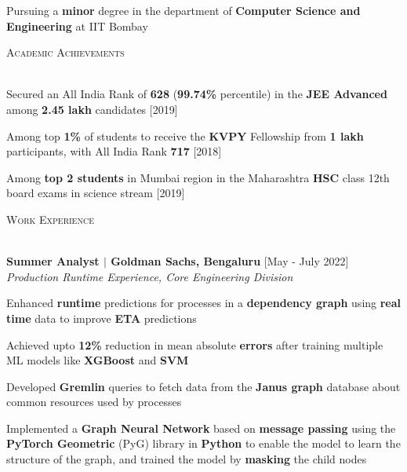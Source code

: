 \documentclass[10pt]{article}
\renewcommand{\section}[1]{
    \vspace*{3pt}
    \textsc{\Large{#1}}
    \vspace*{-8pt} \\ \hspace*{-5pt} 
    \hrulefill \\
    \vspace*{-15pt}
    \vspace*{-5pt}
}
\newcommand{\smallbullet}{
    \small$\bullet$
}
\newenvironment{bullet-list-major}{
    \vspace*{6pt}
    \begin{list}{
        \smallbullet
    }{
        \setlength\leftmargin{15pt}\topsep -5pt \itemsep -6pt
    }
} {
    \end{list}
}
\newcommand{\bigblock}[3]{
    {
        \vspace*{2pt}
        \hspace*{-8pt} {\large{\textbf{#1}}} \hfill #2 \newline
        \textit{\textsf{#3}}
    }
}
\newenvironment{bullet-list-minor}{
    \begin{list}{
        \smallbullet
    }{
        \setlength\leftmargin{15pt}\topsep -5pt \itemsep -6pt
    }
} {
    \end{list}
}
\begin{document}


    \vspace{-22pt}
    Pursuing a \textbf{minor} degree in the department of \textbf{Computer Science and Engineering} at IIT Bombay
    \vspace{-5pt}

    \section{Academic Achievements}
    \begin{bullet-list-major}
        \item Secured an All India Rank of \textbf{628} (\textbf{99.74\%} percentile) in the \textbf{JEE Advanced} among \textbf{2.45 lakh} candidates \hfill [2019]
        \item Among top \textbf{1\%} of students to receive the \textbf{KVPY} Fellowship from \textbf{1 lakh} participants, with All India Rank \textbf{717}  \hfill [2018]
        \item Among \textbf{top 2 students} in Mumbai region in the Maharashtra \textbf{HSC} class 12th board exams in science stream   \hfill [2019]
    \end{bullet-list-major}


    \section{Work Experience}

    \bigblock{
        Summer Analyst \(|\) Goldman Sachs, Bengaluru
    }{
        [May - July 2022]
    }{
        Production Runtime Experience, Core Engineering Division
    }
    \begin{bullet-list-minor}
        \item Enhanced \textbf{runtime} predictions for processes in a \textbf{dependency graph} using \textbf{real time} data to improve \textbf{ETA} predictions
        \item Achieved upto \textbf{12\%} reduction in mean absolute \textbf{errors} after
        training multiple ML models like \textbf{XGBoost} and \textbf{SVM}
        \item Developed \textbf{Gremlin} queries to fetch data from the \textbf{Janus graph} database about common resources used by processes
        \item Implemented a \textbf{Graph Neural Network} based on \textbf{message passing} using the \textbf{PyTorch Geometric} (PyG) library in \textbf{Python} to enable the model to learn the structure of the graph, and trained the model by \textbf{masking} the child nodes
    \end{bullet-list-minor}
\end{document}
